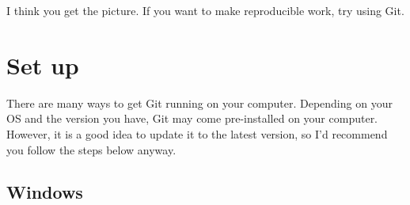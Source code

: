 \documentclass[]{book}
\begin{document}
I think you get the picture. If you want to make reproducible work, try using Git.

\hypertarget{set-up}{%
\section{Set up}\label{set-up}}

There are many ways to get Git running on your computer. Depending on your OS and the version you have, Git may come pre-installed on your computer. However, it is a good idea to update it to the latest version, so I'd recommend you follow the steps below anyway.

\hypertarget{windows}{%
\subsection{Windows}\label{windows}}
\end{document}
